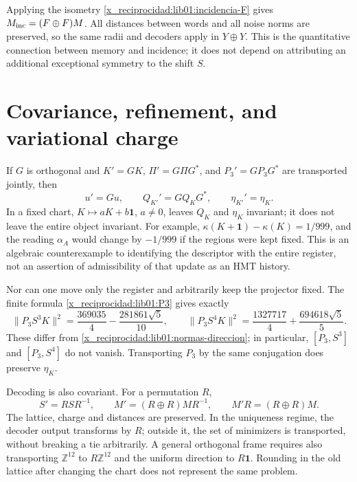 Applying the isometry \eqref{x_reciprocidad:lib01:incidencia-F} gives \(M_{\rm inc}=(F\oplus F)M\). All distances between words and all noise norms are preserved, so the same radii and decoders apply in \(Y\oplus Y\). This is the quantitative connection between memory and incidence; it does not depend on attributing an additional exceptional symmetry to the shift \(S\).

\section{Covariance, refinement, and variational charge}
\label{x_reciprocidad:lib01:covarianza}

If \(G\) is orthogonal and \(K'=GK\), \(\Pi'=G\Pi G^*\), and \(P_3'=GP_3G^*\) are transported jointly, then
\[
 u'=Gu,\qquad Q_{K'}'=GQ_KG^*,\qquad \eta_{K'}'=\eta_K.
\]
In a fixed chart, \(K\mapsto aK+b\mathbf1\), \(a\ne0\), leaves
\(Q_K\) and \(\eta_K\) invariant; it does not leave the entire object invariant.
For example, \(\kappa(K+\mathbf1)-\kappa(K)=1/999\), and the reading
\(\alpha_A\) would change by \(-1/999\) if the regions were kept
fixed. This is an algebraic counterexample to identifying the descriptor with
the entire register, not an assertion of admissibility of that update
as an HMT history.

Nor can one move only the register and arbitrarily keep the projector fixed. The finite formula \eqref{x_reciprocidad:lib01:P3} gives exactly
\[
 \|P_3S^3K\|^2=\frac{369035}{4}-\frac{281861\sqrt5}{10},
 \qquad
 \|P_3S^4K\|^2=\frac{1327717}{4}+\frac{694618\sqrt5}{5}.
\]
These differ from \eqref{x_reciprocidad:lib01:normas-direccion}; in particular, \([P_3,S^3]\) and \([P_3,S^4]\) do not vanish. Transporting \(P_3\) by the same conjugation does preserve \(\eta_K\).

Decoding is also covariant. For a permutation \(R\),
\[
 S'=RSR^{-1},\qquad M'=(R\oplus R)MR^{-1},\qquad
 M'R=(R\oplus R)M.
\]
The lattice, charge and distances are preserved. In the uniqueness regime,
the decoder output transforms by \(R\); outside it,
the set of minimizers is transported, without breaking a tie
arbitrarily. A general orthogonal frame requires also transporting
\(\mathbb Z^{12}\) to \(R\mathbb Z^{12}\) and the uniform direction
to \(R\mathbf1\). Rounding in the old lattice after changing the
chart does not represent the same problem.

